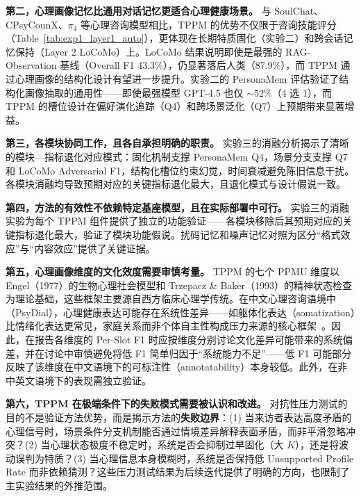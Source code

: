 \documentclass[12pt,a4paper]{article}
\begin{document}
\textbf{第二，心理画像记忆比通用对话记忆更适合心理健康场景。}
与 SoulChat、CPsyCounX、$\pi_4$ 等心理咨询模型相比，TPPM 的优势不仅限于咨询技能评分（Table~\ref{tab:exp1_layer1_auto}），更体现在长期特质固化（实验二）和跨会话记忆保持（Layer 2 LoCoMo）上。LoCoMo 结果说明即使是最强的 RAG-Observation 基线（Overall F1 43.3\%），仍显著落后人类（87.9\%），而 TPPM 通过心理画像的结构化设计有望进一步提升。实验二的 PersonaMem 评估验证了结构化画像抽取的通用性——即使最强模型 GPT-4.5 也仅 $\sim$52\%（4 选 1），而 TPPM 的槽位设计在偏好演化追踪（Q4）和跨场景泛化（Q7）上预期带来显著增益。

\textbf{第三，各模块协同工作，且各自承担明确的职责。}
实验三的消融分析揭示了清晰的模块—指标退化对应模式：固化机制支撑 PersonaMem Q4，场景分支支撑 Q7 和 LoCoMo Adversarial F1，结构化槽位约束幻觉，时间衰减避免陈旧信息干扰。各模块消融均导致预期对应的关键指标退化最大，且退化模式与设计假说一致。

\textbf{第四，方法的有效性不依赖特定基座模型，且在实际部署中可行。}
实验三的消融实验为每个 TPPM 组件提供了独立的功能验证——各模块移除后其预期对应的关键指标退化最大，验证了模块功能假说。扰码记忆和噪声记忆对照为区分``格式效应''与``内容效应''提供了关键证据。

\textbf{第五，心理画像维度的文化效度需要审慎考量。}
TPPM 的七个 PPMU 维度以 Engel（1977）的生物心理社会模型和 Trzepacz \& Baker（1993）的精神状态检查为理论基础，这些框架主要源自西方临床心理学传统。在中文心理咨询语境中（PsyDial），心理健康表达可能存在系统性差异——如躯体化表达（somatization）比情绪化表达更常见，家庭关系而非个体自主性构成压力来源的核心框架~\cite{kirmayer2001cultural}。因此，在报告各维度的 Per-Slot F1 时应按维度分别讨论文化差异可能带来的系统偏差，并在讨论中审慎避免将低 F1 简单归因于``系统能力不足''——低 F1 可能部分反映了该维度在中文语境下的可标注性（annotatability）本身较低。此外，在非中英文语境下的表现需独立验证。

\textbf{第六，TPPM 在极端条件下的失败模式需要被认识和改进。}
对抗性压力测试的目的不是验证方法优势，而是揭示方法的\textbf{失败边界}：(1) 当来访者表达高度矛盾的心理信号时，场景条件分支机制能否通过情境差异解释表面矛盾，而非平滑忽略冲突？(2) 当心理状态极度不稳定时，系统是否会抑制过早固化（大 $K$），还是将波动误判为特质？(3) 当心理信息本身模糊时，系统是否保持低 Unsupported Profile Rate 而非依赖猜测？这些压力测试结果为后续迭代提供了明确的方向，也限制了主实验结果的外推范围。
\end{document}
